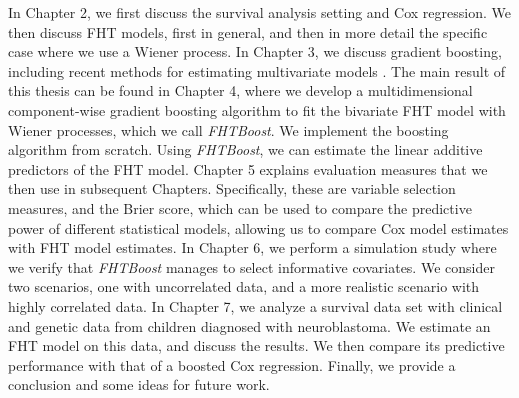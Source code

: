 In Chapter 2, we first discuss the survival analysis setting and Cox regression.
We then discuss FHT models, first in general, and then in more detail the specific case where we use a Wiener process.
In Chapter 3, we discuss gradient boosting, including recent methods for estimating multivariate models \citep{schmid, thomas2018}.
The main result of this thesis can be found in Chapter 4, where we develop a multidimensional component-wise gradient boosting algorithm to fit the bivariate FHT model with Wiener processes, which we call \textit{FHTBoost}.
We implement the boosting algorithm from scratch.
Using \textit{FHTBoost}, we can estimate the linear additive predictors of the FHT model.
Chapter 5 explains evaluation measures that we then use in subsequent Chapters.
Specifically, these are variable selection measures, and the Brier score, which can be used to compare the predictive power of different statistical models, allowing us to compare Cox model estimates with FHT model estimates.
In Chapter 6, we perform a simulation study where we verify that \textit{FHTBoost} manages to select informative covariates.
We consider two scenarios, one with uncorrelated data, and a more realistic scenario with highly correlated data.
In Chapter 7, we analyze a survival data set with clinical and genetic data from children diagnosed with neuroblastoma.
We estimate an FHT model on this data, and discuss the results.
We then compare its predictive performance with that of a boosted Cox regression.
Finally, we provide a conclusion and some ideas for future work.